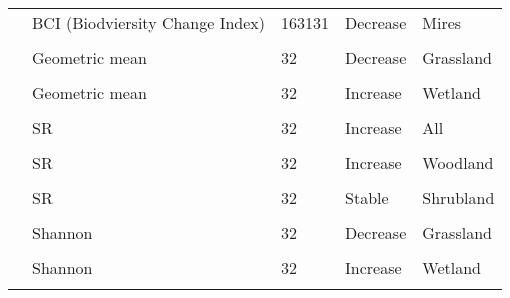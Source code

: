 \documentclass[
  12pt,
  oneside]{report}
\begin{document}
\begin{landscape}
\begin{longtable}[t]{llll>{\raggedright\arraybackslash}p{30em}}
\addlinespace
\cite{normander_indicator_2012} & BCI (Biodviersity Change Index) & 163131 & Decrease & Mires\\
\cellcolor{gray!6}{\cite{schipper_contrasting_2016}} & \cellcolor{gray!6}{Geometric mean} & \cellcolor{gray!6}{32} & \cellcolor{gray!6}{Increase} & \cellcolor{gray!6}{All}\\
\cite{schipper_contrasting_2016} & Geometric mean & 32 & Decrease & Grassland\\
\cellcolor{gray!6}{\cite{schipper_contrasting_2016}} & \cellcolor{gray!6}{Geometric mean} & \cellcolor{gray!6}{32} & \cellcolor{gray!6}{Increase} & \cellcolor{gray!6}{Woodland}\\
\cite{schipper_contrasting_2016} & Geometric mean & 32 & Increase & Wetland\\
\addlinespace
\cellcolor{gray!6}{\cite{schipper_contrasting_2016}} & \cellcolor{gray!6}{Geometric mean} & \cellcolor{gray!6}{32} & \cellcolor{gray!6}{Stable} & \cellcolor{gray!6}{Shrubland}\\
\cite{schipper_contrasting_2016} & SR & 32 & Increase & All\\
\cellcolor{gray!6}{\cite{schipper_contrasting_2016}} & \cellcolor{gray!6}{SR} & \cellcolor{gray!6}{32} & \cellcolor{gray!6}{Decrease} & \cellcolor{gray!6}{Grassland}\\
\cite{schipper_contrasting_2016} & SR & 32 & Increase & Woodland\\
\cellcolor{gray!6}{\cite{schipper_contrasting_2016}} & \cellcolor{gray!6}{SR} & \cellcolor{gray!6}{32} & \cellcolor{gray!6}{Increase} & \cellcolor{gray!6}{Wetland}\\
\addlinespace
\cite{schipper_contrasting_2016} & SR & 32 & Stable & Shrubland\\
\cellcolor{gray!6}{\cite{schipper_contrasting_2016}} & \cellcolor{gray!6}{Shannon} & \cellcolor{gray!6}{32} & \cellcolor{gray!6}{Increase} & \cellcolor{gray!6}{All}\\
\cite{schipper_contrasting_2016} & Shannon & 32 & Decrease & Grassland\\
\cellcolor{gray!6}{\cite{schipper_contrasting_2016}} & \cellcolor{gray!6}{Shannon} & \cellcolor{gray!6}{32} & \cellcolor{gray!6}{Increase} & \cellcolor{gray!6}{Woodland}\\
\cite{schipper_contrasting_2016} & Shannon & 32 & Increase & Wetland\\
\addlinespace
\cellcolor{gray!6}{\cite{schipper_contrasting_2016}} & \cellcolor{gray!6}{Shannon} & \cellcolor{gray!6}{32} & \cellcolor{gray!6}{Increase} & \cellcolor{gray!6}{Shrubland}\\

\end{longtable}
\end{landscape}
\end{document}
